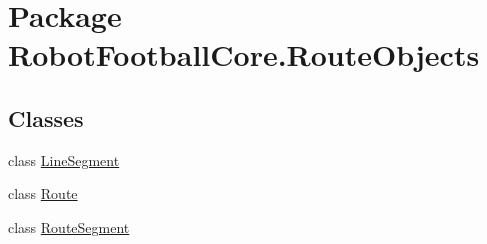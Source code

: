 \hypertarget{namespace_robot_football_core_1_1_route_objects}{\section{Package Robot\-Football\-Core.\-Route\-Objects}
\label{namespace_robot_football_core_1_1_route_objects}
}
\subsection*{Classes}
\begin{DoxyCompactItemize}
\item 
class \hyperlink{class_robot_football_core_1_1_route_objects_1_1_line_segment}{Line\-Segment}
\item 
class \hyperlink{class_robot_football_core_1_1_route_objects_1_1_route}{Route}
\item 
class \hyperlink{class_robot_football_core_1_1_route_objects_1_1_route_segment}{Route\-Segment}
\end{DoxyCompactItemize}
